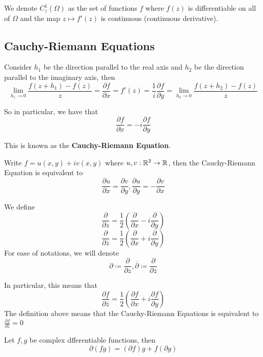 \begin{definition}
We denote $C^1_z(\Omega)$ as the set of functions $f$ where $f(z)$ is differentiable on all of $\Omega$ and the map $z \mapsto f'(z)$ is continuous (continuous derivative).
\end{definition}

\subsection{Cauchy-Riemann Equations}

Consider $h_1$ be the direction parallel to the real axis and $h_2$ be the direction parallel to the imaginary axis, then
\[\lim_{h_1 \to 0} \frac{f(z + h_1) - f(z)}{z} = \frac{\partial f}{\partial x} = f'(z) = \frac{1}{i} \frac{\partial f}{\partial y} = \lim_{h_2 \to 0} \frac{f(z + h_2) - f(z)}{z}\]

So in particular, we have that
\[\frac{\partial f}{\partial x} = -i \frac{\partial f}{\partial y}\]

This is known as the \textbf{Cauchy-Riemann Equation}.

\begin{remark}
    Write $f = u(x, y) + i v(x, y)$ where $u, v: \mathbb{R}^2 \to \mathbb{R}$, then the Cauchy-Riemann Equation is equivalent to
    \[\frac{\partial u}{\partial x} = \frac{\partial v}{\partial y}, \frac{\partial u}{\partial y} = -\frac{\partial v}{\partial x}\]
\end{remark}

\begin{definition}
We define
\[\frac{\partial}{\partial z} = \frac{1}{2}(\frac{\partial}{\partial x} - i \frac{\partial}{\partial y})\]
\[\frac{\partial}{\partial \overline{z}} = \frac{1}{2}(\frac{\partial}{\partial x} + i \frac{\partial}{\partial y})\]
For ease of notations, we will denote
\[\partial \coloneqq \frac{\partial}{\partial z}, \overline{\partial} \coloneqq \frac{\partial}{\partial \overline{z}}\]
\end{definition}

\begin{remark}
In particular, this means that
\[\frac{\partial f}{\partial \overline{z}} = \frac{1}{2}(\frac{\partial f}{\partial x} + i \frac{\partial f}{\partial y})\]
    The definition above means that the Cauchy-Riemann Equations is equivalent to $\frac{\partial f}{\partial \overline{z}} = 0$
\end{remark}

\begin{proposition}
    Let $f, g$ be complex dfferentiable functions, then
    \[\partial(f g) = (\partial f) g + f (\partial g)\]
\end{proposition}

